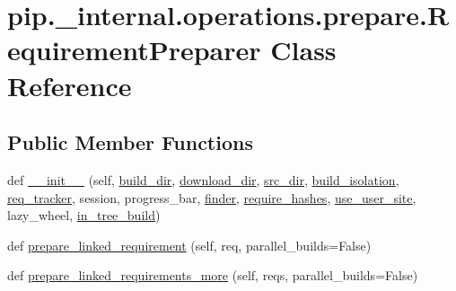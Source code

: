 \hypertarget{classpip_1_1__internal_1_1operations_1_1prepare_1_1RequirementPreparer}{}\section{pip.\+\_\+internal.\+operations.\+prepare.\+Requirement\+Preparer Class Reference}
\label{classpip_1_1__internal_1_1operations_1_1prepare_1_1RequirementPreparer}
\subsection*{Public Member Functions}
\begin{DoxyCompactItemize}
\item 
def \hyperlink{classpip_1_1__internal_1_1operations_1_1prepare_1_1RequirementPreparer_a390b7e66c9cfd61960ffbdb1b51b3340}{\+\_\+\+\_\+init\+\_\+\+\_\+} (self, \hyperlink{classpip_1_1__internal_1_1operations_1_1prepare_1_1RequirementPreparer_a93f833daaa57d658c139553530967f4a}{build\+\_\+dir}, \hyperlink{classpip_1_1__internal_1_1operations_1_1prepare_1_1RequirementPreparer_acf0adba9dd168d050c1ba87ac61c5ee8}{download\+\_\+dir}, \hyperlink{classpip_1_1__internal_1_1operations_1_1prepare_1_1RequirementPreparer_a3b03911c99e31032ac046f43f5e12aee}{src\+\_\+dir}, \hyperlink{classpip_1_1__internal_1_1operations_1_1prepare_1_1RequirementPreparer_a53e52b0114bffe5935d05c3b63ea443a}{build\+\_\+isolation}, \hyperlink{classpip_1_1__internal_1_1operations_1_1prepare_1_1RequirementPreparer_a5eb08766a136d02155138d84c942d6d6}{req\+\_\+tracker}, session, progress\+\_\+bar, \hyperlink{classpip_1_1__internal_1_1operations_1_1prepare_1_1RequirementPreparer_a89e868222c54eb36df489027e0be83ac}{finder}, \hyperlink{classpip_1_1__internal_1_1operations_1_1prepare_1_1RequirementPreparer_aa8f605003b9a038167f777754f71f33c}{require\+\_\+hashes}, \hyperlink{classpip_1_1__internal_1_1operations_1_1prepare_1_1RequirementPreparer_ad70d699208bc934d03c389c44e53325b}{use\+\_\+user\+\_\+site}, lazy\+\_\+wheel, \hyperlink{classpip_1_1__internal_1_1operations_1_1prepare_1_1RequirementPreparer_a57817f94ce0461d2a8b465e83eed42fd}{in\+\_\+tree\+\_\+build})
\item 
def \hyperlink{classpip_1_1__internal_1_1operations_1_1prepare_1_1RequirementPreparer_a112bf5c78474500ff9c4c6b4101e4a6b}{prepare\+\_\+linked\+\_\+requirement} (self, req, parallel\+\_\+builds=False)
\item 
def \hyperlink{classpip_1_1__internal_1_1operations_1_1prepare_1_1RequirementPreparer_a5f69807811d6df6a3577e9a6988c202e}{prepare\+\_\+linked\+\_\+requirements\+\_\+more} (self, reqs, parallel\+\_\+builds=False)

\end{DoxyCompactItemize}
